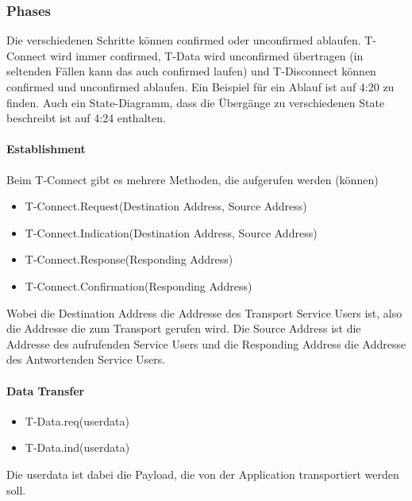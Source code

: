         \subsubsection{Phases}  
            Die verschiedenen Schritte können confirmed oder unconfirmed ablaufen. T-Connect wird immer confirmed, T-Data wird unconfirmed übertragen (in seltenden Fällen kann das auch confirmed laufen) und T-Disconnect können confirmed und unconfirmed ablaufen. Ein Beispiel für ein Ablauf ist auf 4:20 zu finden. Auch ein State-Diagramm, dass die Übergänge zu verschiedenen State beschreibt ist auf 4:24 enthalten.

            \paragraph{Establishment}
                Beim T-Connect gibt es mehrere Methoden, die aufgerufen werden (können)
                \begin{itemize}
                    \item T-Connect.Request(Destination Address, Source Address)
                    \item T-Connect.Indication(Destination Address, Source Address)
                    \item T-Connect.Response(Responding Address)
                    \item T-Connect.Confirmation(Responding Address)
                \end{itemize}
                Wobei die Destination Address die Addresse des Transport Service Users ist, also die Addresse die zum Transport gerufen wird. Die Source Address ist die Addresse des aufrufenden Service Users und die Responding Address die Addresse des Antwortenden Service Users. 

            \paragraph{Data Transfer}
                \begin{itemize}
                    \item T-Data.req(userdata)
                    \item T-Data.ind(userdata)
                \end{itemize}
                Die userdata ist dabei die Payload, die von der Application transportiert werden soll. 

